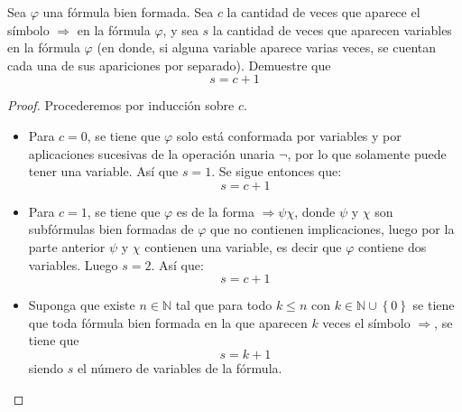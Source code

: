 \documentclass[12pt]{report}
\newcounter{it}
\theoremstyle{largebreak}
\begin{document}
    \begin{excer}
        Sea $\varphi$ una fórmula bien formada. Sea $c$ la cantidad de veces que aparece el símbolo $\Rightarrow$ en la fórmula $\varphi$, y sea $s$ la cantidad de veces que aparecen variables en la fórmula $\varphi$ (en donde, si alguna variable aparece varias veces, se cuentan cada una de sus apariciones por separado). Demuestre que
        \begin{equation*}
            s=c+1
        \end{equation*}
    \end{excer}

    \begin{proof}
        Procederemos por inducción sobre $c$.
        \begin{itemize}
            \item Para $c=0$, se tiene que $\varphi$ solo está conformada por variables y por aplicaciones sucesivas de la operación unaria $\neg$, por lo que solamente puede tener una variable. Así que $s=1$. Se sigue entonces que:
            \begin{equation*}
                s=c+1
            \end{equation*}
            \item Para $c=1$, se tiene que $\varphi$ es de la forma $\Rightarrow\psi\chi$, donde $\psi$ y $\chi$ son subfórmulas bien formadas de $\varphi$ que no contienen implicaciones, luego por la parte anterior $\psi$ y $\chi$ contienen una variable, es decir que $\varphi$ contiene dos variables. Luego $s=2$. Así que:
            \begin{equation*}
                s=c+1
            \end{equation*}
            \item Suponga que existe $n\in\mathbb{N}$ tal que para todo $k\leq n$ con $k\in\mathbb{N}\cup\left\{0\right\}$ se tiene que toda fórmula bien formada en la que aparecen $k$ veces el símbolo $\Rightarrow$, se tiene que
            \begin{equation*}
                s=k+1
            \end{equation*}
            siendo $s$ el número de variables de la fórmula.


\end{itemize}
\end{proof}
\end{document}
